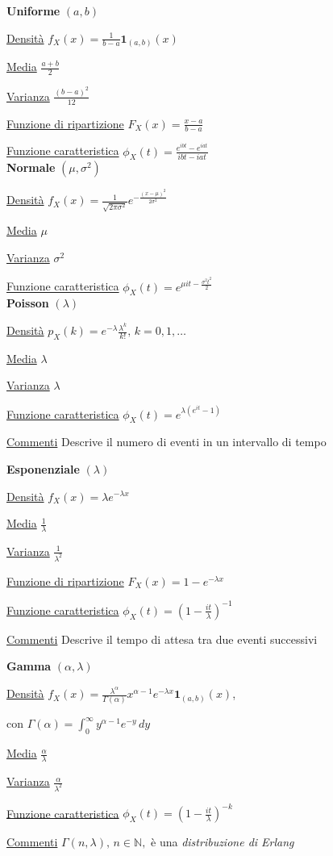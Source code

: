 \documentclass[openany]{book} %
\begin{document}
\begin{multicols}{2}
\textbf{Uniforme} $(a,b)$

\underline{Densità} $f_X(x) = \frac{1}{b-a}\boldsymbol{1}_{(a,b)}(x)$

\underline{Media} $\frac{a+b}{2}$

\underline{Varianza} $\frac{(b-a)^2}{12}$

\underline{Funzione di ripartizione} $F_X(x)=\frac{x-a}{b-a}$

\underline{Funzione caratteristica} $\phi_X(t)=\frac{e^{ibt}-e^{iat}}{ibt-iat}$
\\

\textbf{Normale} $(\mu,\sigma^2)$

\underline{Densità} $f_X(x) = \frac{1}{\sqrt{2\pi\sigma^2}}e^{-\frac{(x-\mu)^2}{2\sigma^2}}$

\underline{Media} $\mu$

\underline{Varianza} $\sigma^2$

\underline{Funzione caratteristica} $\phi_X(t)=e^{\mu it-\frac{\sigma^2t^2}{2}}$
\\

\textbf{Poisson} $(\lambda)$

\underline{Densità} $p_X(k) = e^{-\lambda}\frac{\lambda^k}{k!},\,k=0,1,\dots$

\underline{Media} $\lambda$

\underline{Varianza} $\lambda$

\underline{Funzione caratteristica} $\phi_X(t)=e^{\lambda(e^{it}-1)}$

\underline{Commenti} Descrive il numero di eventi in un intervallo di tempo

\columnbreak

\textbf{Esponenziale} $(\lambda)$

\underline{Densità} $f_X(x) = \lambda e^{-\lambda x}$

\underline{Media} $\frac{1}{\lambda}$

\underline{Varianza} $\frac{1}{\lambda^2}$

\underline{Funzione di ripartizione} $F_X(x)=1-e^{-\lambda x}$

\underline{Funzione caratteristica} $\phi_X(t)=\left(1-\frac{it}{\lambda}\right)^{-1}$

\underline{Commenti} Descrive il tempo di attesa tra due eventi successivi

\columnbreak

\textbf{Gamma} $(\alpha, \lambda)$

\underline{Densità} $f_X(x) = \frac{\lambda^\alpha}{\Gamma(\alpha)}x^{\alpha-1}e^{-\lambda x}\boldsymbol{1}_{(a,b)}(x)$,

con $\Gamma(\alpha)=\int_0^\infty y^{\alpha-1}e^{-y}\,dy$

\underline{Media} $\frac{\alpha}{\lambda}$

\underline{Varianza} $\frac{\alpha}{\lambda^2}$

\underline{Funzione caratteristica} $\phi_X(t)=\left(1-\frac{it}{\lambda}\right)^{-k}$

\underline{Commenti} $\Gamma(n,\lambda),\,n\in \mathbb{N},$ è una \textit{distribuzione di Erlang}

\end{multicols}
\end{document}
